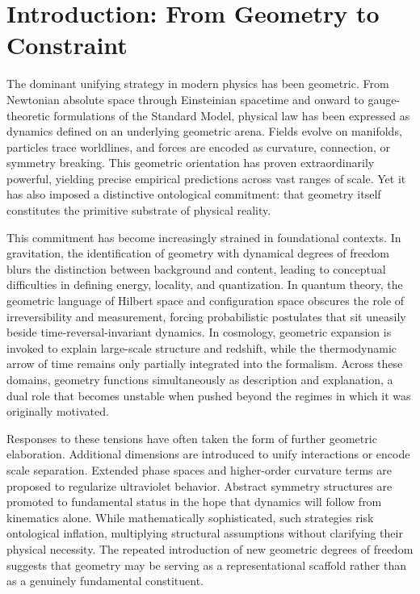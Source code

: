 \documentclass[11pt]{article}
\begin{document}
\newpage
\section{Introduction: From Geometry to Constraint}

The dominant unifying strategy in modern physics has been geometric. From Newtonian absolute space through Einsteinian spacetime and onward to gauge-theoretic formulations of the Standard Model, physical law has been expressed as dynamics defined on an underlying geometric arena. Fields evolve on manifolds, particles trace worldlines, and forces are encoded as curvature, connection, or symmetry breaking. This geometric orientation has proven extraordinarily powerful, yielding precise empirical predictions across vast ranges of scale. Yet it has also imposed a distinctive ontological commitment: that geometry itself constitutes the primitive substrate of physical reality.

This commitment has become increasingly strained in foundational contexts. In gravitation, the identification of geometry with dynamical degrees of freedom blurs the distinction between background and content, leading to conceptual difficulties in defining energy, locality, and quantization. In quantum theory, the geometric language of Hilbert space and configuration space obscures the role of irreversibility and measurement, forcing probabilistic postulates that sit uneasily beside time-reversal-invariant dynamics. In cosmology, geometric expansion is invoked to explain large-scale structure and redshift, while the thermodynamic arrow of time remains only partially integrated into the formalism. Across these domains, geometry functions simultaneously as description and explanation, a dual role that becomes unstable when pushed beyond the regimes in which it was originally motivated.

Responses to these tensions have often taken the form of further geometric elaboration. Additional dimensions are introduced to unify interactions or encode scale separation. Extended phase spaces and higher-order curvature terms are proposed to regularize ultraviolet behavior. Abstract symmetry structures are promoted to fundamental status in the hope that dynamics will follow from kinematics alone. While mathematically sophisticated, such strategies risk ontological inflation, multiplying structural assumptions without clarifying their physical necessity. The repeated introduction of new geometric degrees of freedom suggests that geometry may be serving as a representational scaffold rather than as a genuinely fundamental constituent.
\end{document}
